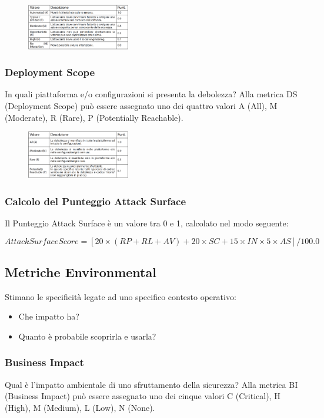 \begin{figure}[hbpt!]
    \centering
    \includegraphics[width=0.4\textwidth]{./Images/cap3/3.13.png}
\end{figure}
\FloatBarrier

\subsubsection{Deployment Scope}
In quali piattaforma e/o configurazioni
si presenta la debolezza? Alla metrica DS (Deployment Scope) può essere
assegnato uno dei quattro valori
A (All), M (Moderate), R (Rare), P (Potentially Reachable).

\begin{figure}[hbpt!]
    \centering
    \includegraphics[width=0.4\textwidth]{./Images/cap3/3.14.png}
\end{figure}
\FloatBarrier

\subsubsection{Calcolo del Punteggio Attack Surface}
Il Punteggio Attack Surface è un valore tra 0 e 1,
calcolato nel modo seguente:

\[AttackSurfaceScore = [20 \times (RP+RL+AV)+20 \times SC + 15 \times IN \times 5 \times AS]/100.0\]

\subsection{Metriche Environmental}
Stimano le specificità legate ad uno specifico
contesto operativo:
\begin{itemize}
    \item Che impatto ha?
    \item Quanto è probabile scoprirla e usarla?
\end{itemize}

\subsubsection{Business Impact}
Qual è l’impatto ambientale di uno
sfruttamento della sicurezza? Alla metrica BI (Business Impact) può essere
assegnato uno dei cinque valori
C (Critical), H (High), M (Medium), L (Low), N (None).

